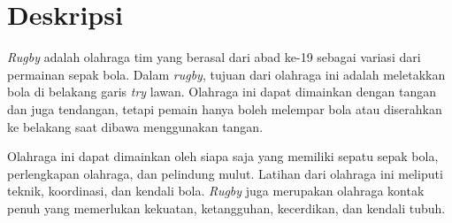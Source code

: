 \documentclass[a4paper,twoside]{article}
\begin{document}
\title{\@judultopik}
\author{\nama \textendash \@npm} 

\newcommand{\nama}{Nathanael Adi Trianto}
\newcommand{\@npm}{6181901041}
\newcommand{\@judultopik}{Pembuatan Ulang Aplikasi Rugby Indonesia dengan Ionic 7 dan Capacitor} %
\newcommand{\jumpemb}{1} %
\newcommand{\tanggal}{22/09/2023}


\maketitle


\section{Deskripsi}
\textit{Rugby} adalah olahraga tim yang berasal dari abad ke-19 sebagai variasi dari permainan sepak bola. Dalam \textit{rugby}, tujuan dari olahraga ini adalah meletakkan bola di belakang garis \textit{try} lawan. Olahraga ini dapat dimainkan dengan tangan dan juga tendangan, tetapi pemain hanya boleh melempar bola atau diserahkan ke belakang saat dibawa menggunakan tangan. 

Olahraga ini dapat dimainkan oleh siapa saja yang memiliki sepatu sepak bola, perlengkapan olahraga, dan pelindung mulut. Latihan dari olahraga ini meliputi teknik, koordinasi, dan kendali bola. \textit{Rugby} juga merupakan olahraga kontak penuh yang memerlukan kekuatan, ketangguhan, kecerdikan, dan kendali tubuh.


\end{document}
